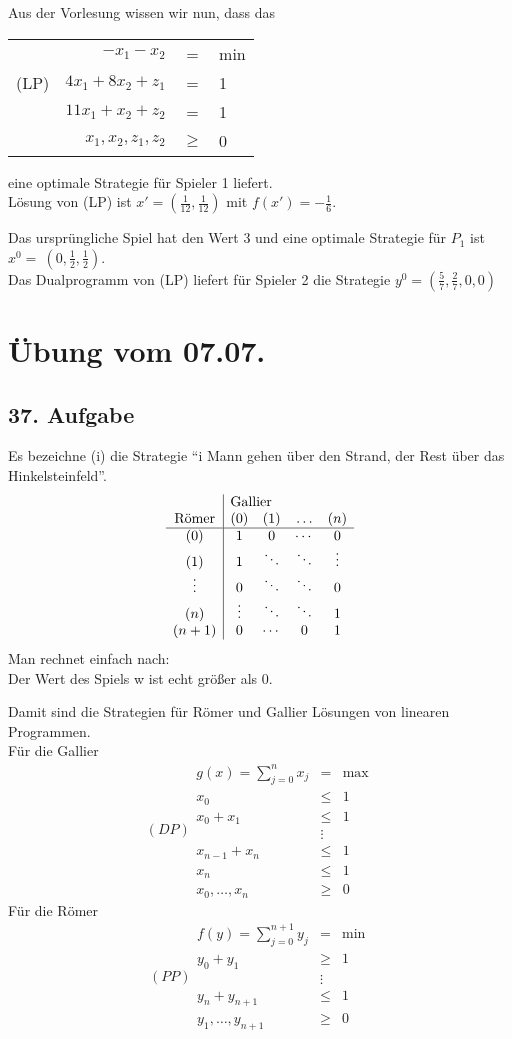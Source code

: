 \documentclass[a4paper,11pt,twoside,titlepage]{article}
\begin{document}
Aus der Vorlesung wissen wir nun, dass das
\begin{center}
\begin{tabular}{c|rcl|}\cline{2-4}
~&$-x_1-x_2$&=&min\\
(LP)&$4x_1+8x_2+z_1$&=&1\\
&$11x_1+x_2+z_2$&=&1\\
&$x_1,x_2,z_1,z_2$&$\ge$&0\\\cline{2-4}
\end{tabular}
\end{center}
eine optimale Strategie für Spieler 1 liefert.\\ Lösung von (LP) ist $x'=(\frac{1}{12},\frac{1}{12})$ mit $f(x')=-\frac{1}{6}$.

Das ursprüngliche Spiel hat den Wert 3 und eine optimale Strategie für $P_1$ ist $x^0=~(0,\frac{1}{2},\frac{1}{2})$.\\
Das Dualprogramm von (LP) liefert für Spieler 2 die Strategie $y^0=(\frac{5}{7},\frac{2}{7},0,0)$


\newpage
\section{Übung vom 07.07.}

\subsection*{37. Aufgabe}
Es bezeichne (i) die Strategie "`i Mann gehen über den Strand, der Rest über das Hinkelsteinfeld"'.
\[\begin{array}{c|cccc}
&\multicolumn{4}{l}{\textnormal{Gallier}}\\
\textnormal{Römer}&(0)&(1)&\ldots&(n)\\\hline
(0)&1&0&\cdots&0\\
(1)&1&\ddots&\ddots&\vdots\\
\vdots&0&\ddots&\ddots&0\\
(n)&\vdots&\ddots&\ddots&1\\
(n+1)&0&\cdots&0&1
\end{array}\]
Man rechnet einfach nach:\\
Der Wert des Spiels w ist echt größer als 0.

Damit sind die Strategien für Römer und Gallier Lösungen von linearen Programmen.\\
Für die Gallier
\[(DP)\begin{array}{rcl}
g(x)=\sum_{j=0}^nx_j&=&\max\\
x_0&\leq&1\\
x_0+x_1&\leq&1\\
&\vdots&\\
x_{n-1}+x_n&\leq&1\\
x_n&\leq&1\\
x_0,\ldots,x_n&\geq&0
\end{array}\]
Für die Römer
\[(PP)\begin{array}{rcl}
f(y)=\sum_{j=0}^{n+1}y_j&=&\min\\
y_0+y_1&\geq&1\\
&\vdots&\\
y_n+y_{n+1}&\leq&1\\
y_1,\ldots,y_{n+1}&\geq&0
\end{array}\]
\end{document}
